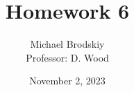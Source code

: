 


\title{Homework 6}
\date{November 2, 2023}
\author{Michael Brodskiy\\ \small Professor: D. Wood}



\maketitle

